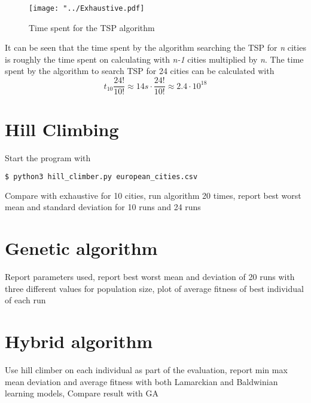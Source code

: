\documentclass{article}
\begin{document}
\begin{figure}[H]
\begin{center}
\texttt{[image: "../Exhaustive.pdf]}
\caption{Time spent for the TSP algorithm}
\end{center}
\end{figure}

It can be seen that the time spent by the algorithm searching the TSP for \textit{n} cities is roughly the time spent on calculating with \textit{n-1} cities multiplied by \textit{n}. The time spent by the algorithm to search TSP for 24 cities can be calculated with
\[
	t_{10} \frac{24!}{10!} \approx 14s \cdot \frac{24!}{10!} \approx 2.4 \cdot 10^{18}
\]


\section{Hill Climbing}

Start the program with
\begin{lstlisting}[language=bash]
	$ python3 hill_climber.py european_cities.csv 
\end{lstlisting}
Compare with exhaustive for 10 cities, run algorithm 20 times, report best worst mean and standard deviation for 10 runs and 24 runs
\section{Genetic algorithm}
Report parameters used, report best worst mean and deviation of 20 runs with three different values for population size, plot of average fitness of best individual of each run
\section{Hybrid algorithm}
Use hill climber on each individual as part of the evaluation, report min max mean deviation and average fitness with both Lamarckian and Baldwinian learning models, Compare result with GA
\end{document}

